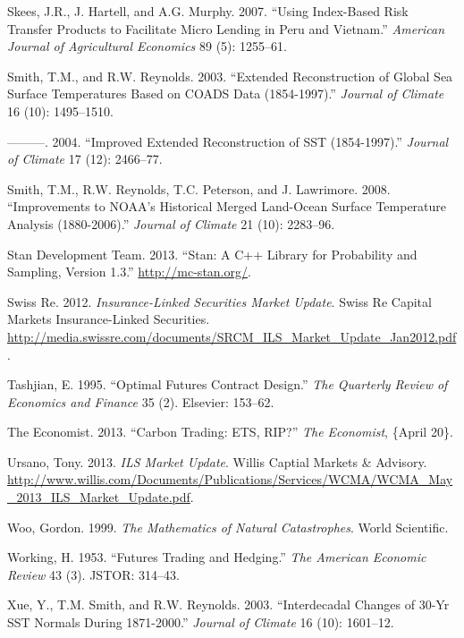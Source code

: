 \documentclass[article]{jss}
\begin{document}
Skees, J.R., J. Hartell, and A.G. Murphy. 2007. ``Using Index-Based Risk
Transfer Products to Facilitate Micro Lending in Peru and Vietnam.''
\emph{American Journal of Agricultural Economics} 89 (5): 1255--61.

Smith, T.M., and R.W. Reynolds. 2003. ``Extended Reconstruction of
Global Sea Surface Temperatures Based on COADS Data (1854-1997).''
\emph{Journal of Climate} 16 (10): 1495--1510.

---------. 2004. ``Improved Extended Reconstruction of SST
(1854-1997).'' \emph{Journal of Climate} 17 (12): 2466--77.

Smith, T.M., R.W. Reynolds, T.C. Peterson, and J. Lawrimore. 2008.
``Improvements to NOAA's Historical Merged Land-Ocean Surface
Temperature Analysis (1880-2006).'' \emph{Journal of Climate} 21 (10):
2283--96.

Stan Development Team. 2013. ``Stan: A C++ Library for Probability and
Sampling, Version 1.3.'' \url{http://mc-stan.org/}.

Swiss Re. 2012. \emph{Insurance-Linked Securities Market Update}. Swiss
Re Capital Markets Insurance-Linked Securities.
\url{http://media.swissre.com/documents/SRCM_ILS_Market_Update_Jan2012.pdf}.

Tashjian, E. 1995. ``Optimal Futures Contract Design.'' \emph{The
Quarterly Review of Economics and Finance} 35 (2). Elsevier: 153--62.

The Economist. 2013. ``Carbon Trading: ETS, RIP?'' \emph{The Economist},
\{April 20\}.

Ursano, Tony. 2013. \emph{ILS Market Update}. Willis Captial Markets \&
Advisory.
\url{http://www.willis.com/Documents/Publications/Services/WCMA/WCMA_May_2013_ILS_Market_Update.pdf}.

Woo, Gordon. 1999. \emph{The Mathematics of Natural Catastrophes}. World
Scientific.

Working, H. 1953. ``Futures Trading and Hedging.'' \emph{The American
Economic Review} 43 (3). JSTOR: 314--43.

Xue, Y., T.M. Smith, and R.W. Reynolds. 2003. ``Interdecadal Changes of
30-Yr SST Normals During 1871-2000.'' \emph{Journal of Climate} 16 (10):
1601--12.
\end{document}
